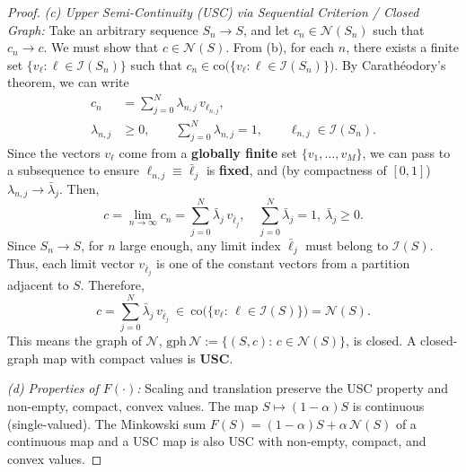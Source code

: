 \documentclass{ccjnl}
\begin{document}
\begin{proof}
\textit{(c) Upper Semi-Continuity (USC) via Sequential Criterion / Closed Graph:}
Take an arbitrary sequence $S_n\to S$, and let $c_n\in\mathcal N(S_n)$ such that $c_n\to c$. We must show that $c\in\mathcal N(S)$. From (b), for each $n$, there exists a finite set $\{v_{\ell}: \ell\in\mathcal I(S_n)\}$ such that $c_n\in\mathrm{co}\big(\{v_{\ell}:\ell\in\mathcal I(S_n)\}\big)$. By Carathéodory's theorem, we can write
\begin{equation}
\begin{aligned}
c_n&=\sum_{j=0}^{N} \lambda_{n,j}\, v_{\ell_{n,j}},\\
\lambda_{n,j}&\ge 0,\qquad
\sum_{j=0}^{N}\lambda_{n,j}=1,\qquad
\ell_{n,j}\in\mathcal I(S_n).
\end{aligned}
\end{equation}
Since the vectors $v_{\ell}$ come from a \textbf{globally finite} set $\{v_1,\dots,v_M\}$, we can pass to a subsequence to ensure $\ell_{n,j}\equiv \bar\ell_j$ is \textbf{fixed}, and (by compactness of $[0,1]$) $\lambda_{n,j}\to \bar\lambda_j$. Then,
\begin{equation}
c=\lim_{n\to\infty} c_n=\sum_{j=0}^{N}\bar\lambda_j\, v_{\bar\ell_j},
\quad\sum_{j=0}^{N}\bar\lambda_j=1,\ \bar\lambda_j\ge 0.
\end{equation}
Since $S_n\to S$, for $n$ large enough, any limit index $\bar\ell_j$ must belong to $\mathcal I(S)$. Thus, each limit vector $v_{\bar\ell_j}$ is one of the constant vectors from a partition adjacent to $S$. Therefore,
\begin{equation}
c=\sum_{j=0}^{N}\bar\lambda_j\, v_{\bar\ell_j}\ \in\ 
\mathrm{co}\big(\{v_\ell:\,\ell\in\mathcal I(S)\}\big)=\mathcal N(S).
\end{equation}
This means the graph of $\mathcal N$, $\mathrm{gph}\,\mathcal N:=\{(S,c):\,c\in\mathcal N(S)\}$, is closed. A closed-graph map with compact values is \textbf{USC}.

\textit{(d) Properties of $F(\cdot)$:}
Scaling and translation preserve the USC property and non-empty, compact, convex values. The map $S\mapsto (1-\alpha)S$ is continuous (single-valued). The Minkowski sum $F(S)=(1-\alpha)S+\alpha\,\mathcal N(S)$ of a continuous map and a USC map is also USC with non-empty, compact, and convex values.
\end{proof}
\end{document}
